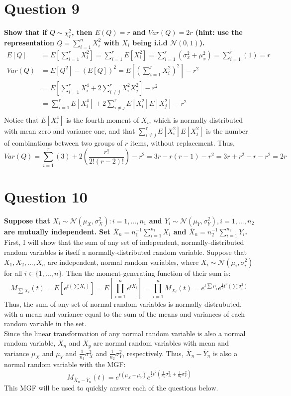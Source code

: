 \documentclass{article}
\newcommand{\N}{\mathcal{N}}
\newcommand{\olx}[1]{\overline{X}_{#1}}
\begin{document}
\section*{Question 9}
\textbf{Show that if $Q\sim \chi^2_r$, then $E(Q)=r$ and $Var(Q)=2r$ (hint: use the representation $Q=\sum_{i=1}^n X_i^2$ with $X_i$ being i.i.d $\N(0,1)$).}
\begin{align*}
	E[Q]	&= E\left[\sum_{i=1}^r X_i^2\right] = \sum_{i=1}^r E[X_i^2] = \sum_{i=1}^r(\sigma_x^2 + \mu_x^2) = \sum_{i=1}^r(1) = r	\\
	Var(Q)	&= E[Q^2] - \left(E[Q]\right)^2 = E\left[\left(\sum_{i=1}^rX_i^2\right)^2\right] - r^2	\\
			&= E\left[\sum_{i=1}^rX_i^4 + 2\sum_{i\neq j}^r X_i^2X_j^2\right] - r^2	\\
			&= \sum_{i=1}^rE\left[X_i^4\right] + 2\sum_{i\neq j}^rE[X_i^2]E[X_j^2] - r^2 \\
\end{align*}
Notice that $E\left[X_i^4\right]$ is the fourth moment of $X_i$, which is normally distributed with mean zero and variance one, and that $\sum_{i\neq j}^rE[X_i^2]E[X_j^2]$ is the number of combinations between two groups of $r$ items, without replacement. Thus,
\[
	Var(Q) = \sum_{i=1}^r(3) + 2\left(\frac{r!}{2!(r-2)!}\right) - r^2 = 3r-r(r-1)-r^2 = 3r+r^2-r-r^2 = 2r
\]


\section*{Question 10}
\textbf{Suppose that $X_i\sim\N(\mu_X,\sigma^2_X):i=1,...,n_1$ and $Y_i\sim\N(\mu_Y,\sigma_Y^2),i=1,...,n_2$ are mutually independent. Set $\overline{X}_n=n_1^{-1}\sum_{i=1}^{n_1}X_i$ and $\overline{X}_n=n_2^{-1}\sum_{i=1}^{n_2}Y_i$.}
\bigskip \\
First, I will show that the sum of any set of independent, normally-distributed random variables is itself a normally-distributed random variable. Suppose that $X_1,X_2,...,X_n$ are independent, normal random variables, where $X_i\sim\N(\mu_i,\sigma^2_i)$ for all $i\in\{1,...,n\}$. Then the moment-generating function of their sum is:
\[
	M_{\sum X_i}(t) = E\left[e^{t(\sum X_i)}\right] = E\left[\prod_{i=1}^n e^{tX_i}\right] = \prod_{i=1}^n M_{X_i}(t) 
	= e^{t\sum\mu_i}e^{\frac{1}{2}t^2(\sum\sigma_i^2)}
\]
Thus, the sum of any set of normal random variables is normally distrubuted, with a mean and variance equal to the sum of the means and variances of each random variable in the set.
\smallskip \\
Since the linear transformation of any normal random variable is also a normal random variable, $\olx{n}$ and $\olx{y}$ are normal random variables with mean and variance $\mu_X$ and $\mu_Y$ and $\frac{1}{n_1}\sigma_X^2$ and $\frac{1}{n_2}\sigma_Y^2$, respectively. Thus, $\overline{X}_n-\overline{Y}_n$ is also a normal random variable with the MGF:
\[
	M_{\overline{X}_n-\overline{Y}_n}(t) = e^{t(\mu_X-\mu_Y)}e^{\frac{1}{2}t^2(\frac{1}{n_1}\sigma_X^2+\frac{1}{n_2}\sigma_Y^2)}
\]
This MGF will be used to quickly answer each of the questions below.
\end{document}
